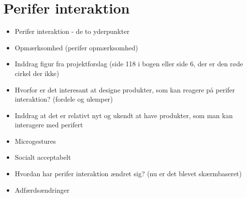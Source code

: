 \chapter{Perifer interaktion}
\label{PeriferInteratkion}
%
\begin{itemize}
  \item Perifer interaktion - de to yderpunkter
  \item Opmærksomhed (perifer opmærksomhed)
  \item Inddrag figur fra projektforslag (side 118 i bogen eller side 6, der er den røde cirkel der ikke)
  \item Hvorfor er det interesant at designe produkter, som kan reagere på perifer interaktion? (fordele og ulemper) 
  \item Inddrag at det er relativt nyt og ukendt at have produkter, som man kan interagere med perifert 
  \item Microgestures 
  \item Socialt acceptabelt 
  \item Hvordan har perifer interaktion ændret sig? (nu er det blevet skærmbaseret)
  \item Adfærdsændringer  
\end{itemize}



